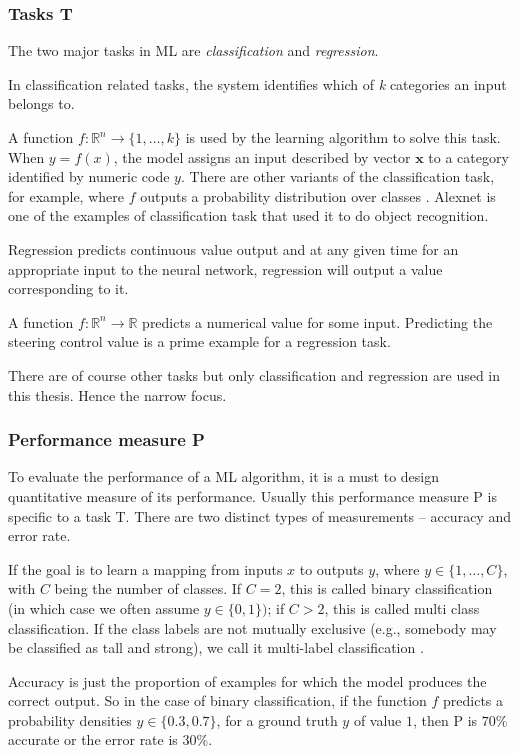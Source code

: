 \subsubsection*{Tasks T}
The two major tasks in ML are \textit{classification} and \textit{regression}.

In classification related tasks, the system identifies which of \textit{k} categories an
input belongs to.

A function $f : \mathbb{R}^n \rightarrow\{1, \ldots,k\}$ is used by the
learning algorithm to solve this task. When $y = f(x)$, the model assigns an input
described by vector $\mathbf{x}$ to a category
identified by numeric code $y$. There are other variants of the classification
task, for example, where $f$ outputs a probability distribution over classes
\cite{Goodfellow-et-al-2016_1}. Alexnet \cite{Alexnet2012} is one of the examples of
classification task that used it to do object recognition.

Regression predicts continuous value output and at any given time for an appropriate
input to the neural network, regression will output a value corresponding to it.

A function $f: \mathbb{R}^n \rightarrow \mathbb{R}$ predicts a numerical value for some input.
Predicting the steering control value is a prime example for a regression task.

There are of course other tasks but only classification and regression are used in this
thesis. Hence the narrow focus.

\subsubsection*{Performance measure P}
To evaluate the performance of a ML algorithm, it is a must to design quantitative measure
of its performance. Usually this performance measure P is specific to a task T. There
are two distinct types of measurements -- accuracy and error rate.

If the goal is to learn a mapping from inputs $x$ to outputs $y$, where $y \in \{1,\ldots
, C\}$, with $C$ being the number of classes. If $C = 2$, this is
called binary classification (in which case we often assume $y \in \{0, 1\})$; if $C > 2$, this is called
multi class classification. If the class labels are not mutually exclusive (e.g., somebody may be
classified as tall and strong), we call it multi-label classification
\cite{murphy2013machine_1}.

Accuracy is just the proportion of examples for which the model produces the correct output.
So in the case of binary classification, if the function $f$ predicts a probability
densities $\hat y \in \{0.3, 0.7\}$, for a ground truth $y$ of value $1$, then P is $70\%$
accurate or the error rate is $30\%$.

